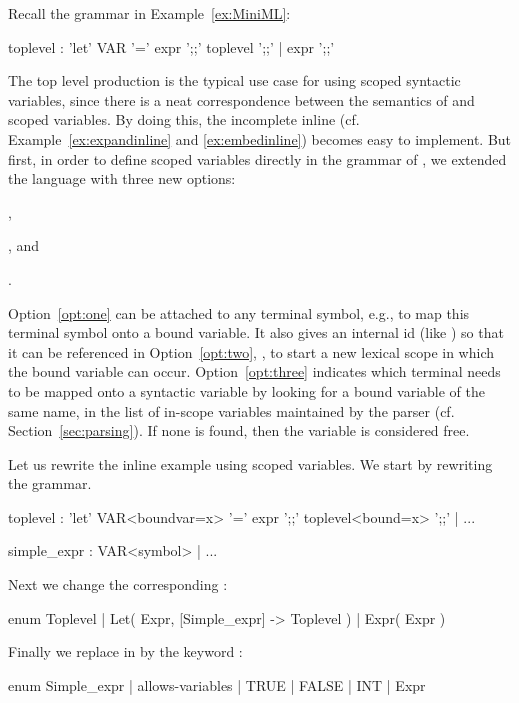 Recall the \MiniML grammar in Example~\ref{ex:MiniML}:
%
\begin{lstANTLR}
toplevel : 'let' VAR '=' expr ';;' toplevel ';;'
          | expr ';;'
\end{lstANTLR}
%
The  top level production is the typical use case for
using scoped syntactic variables, since there is a neat correspondence
between the semantics of \MiniML {} and \Tosca scoped
variables.  By doing this, the incomplete inline  (cf.~
Example~\ref{ex:expandinline} and \ref{ex:embedinline}) becomes easy
to implement.
%
But first, in order to define scoped variables directly in the \antlr grammar
of \PL, we extended the \antlr language
with three new options: 
\begin{enumerate*} [label=\itshape(\roman*)]
\item \label{opt:one}   ,
\item \label{opt:two}   , and
\item \label{opt:three} .
\end{enumerate*}
%
Option~\ref{opt:one} can be attached to any terminal
symbol, e.g.,  to map 
this terminal symbol onto a bound variable. It also gives an internal id (like
) so that it can be referenced in Option~\ref{opt:two}, , 
to start a new lexical scope in which the bound variable can occur.  
Option~\ref{opt:three} indicates which terminal needs to be mapped onto a syntactic variable
by looking for a bound variable of the same name, in the list of in-scope variables maintained
by the parser (cf. Section~\ref{sec:parsing}). If none is found, then the variable is considered free.

\begin{example} Let us rewrite the inline  example
using scoped variables. We start by rewriting the \MiniML \antlr grammar.
\begin{lstANTLR}
toplevel : 'let' VAR<boundvar=x> '=' expr ';;' 
                   toplevel<bound=x> ';;' | ...

simple_expr : VAR<symbol> | ...
\end{lstANTLR}

Next we change the corresponding :

\begin{lstTosca}
enum Toplevel | Let( Expr, [Simple_expr] -> Toplevel )
                | Expr( Expr )
\end{lstTosca}

Finally we replace  in  
by the keyword :

\begin{lstTosca}
enum Simple_expr | allows-variables | TRUE | FALSE 
                   | INT | Expr
\end{lstTosca}
\end{example}

